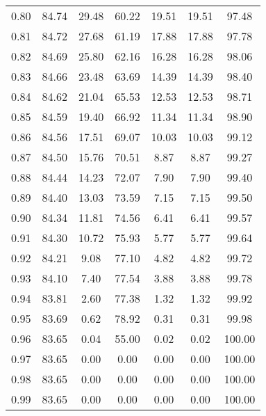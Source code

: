 \begin{tabular}{|c|c|c|c|c|c|c|}
      0.80 &     84.74 &     29.48 &      60.22 &   19.51 &      19.51 &         97.48 \\
      0.81 &     84.72 &     27.68 &      61.19 &   17.88 &      17.88 &         97.78 \\
      0.82 &     84.69 &     25.80 &      62.16 &   16.28 &      16.28 &         98.06 \\
      0.83 &     84.66 &     23.48 &      63.69 &   14.39 &      14.39 &         98.40 \\
      0.84 &     84.62 &     21.04 &      65.53 &   12.53 &      12.53 &         98.71 \\
      0.85 &     84.59 &     19.40 &      66.92 &   11.34 &      11.34 &         98.90 \\
      0.86 &     84.56 &     17.51 &      69.07 &   10.03 &      10.03 &         99.12 \\
      0.87 &     84.50 &     15.76 &      70.51 &    8.87 &       8.87 &         99.27 \\
      0.88 &     84.44 &     14.23 &      72.07 &    7.90 &       7.90 &         99.40 \\
      0.89 &     84.40 &     13.03 &      73.59 &    7.15 &       7.15 &         99.50 \\
      0.90 &     84.34 &     11.81 &      74.56 &    6.41 &       6.41 &         99.57 \\
      0.91 &     84.30 &     10.72 &      75.93 &    5.77 &       5.77 &         99.64 \\
      0.92 &     84.21 &      9.08 &      77.10 &    4.82 &       4.82 &         99.72 \\
      0.93 &     84.10 &      7.40 &      77.54 &    3.88 &       3.88 &         99.78 \\
      0.94 &     83.81 &      2.60 &      77.38 &    1.32 &       1.32 &         99.92 \\
      0.95 &     83.69 &      0.62 &      78.92 &    0.31 &       0.31 &         99.98 \\
      0.96 &     83.65 &      0.04 &      55.00 &    0.02 &       0.02 &        100.00 \\
      0.97 &     83.65 &      0.00 &       0.00 &    0.00 &       0.00 &        100.00 \\
      0.98 &     83.65 &      0.00 &       0.00 &    0.00 &       0.00 &        100.00 \\
      0.99 &     83.65 &      0.00 &       0.00 &    0.00 &       0.00 &        100.00 \\
\bottomrule
\end{tabular}
